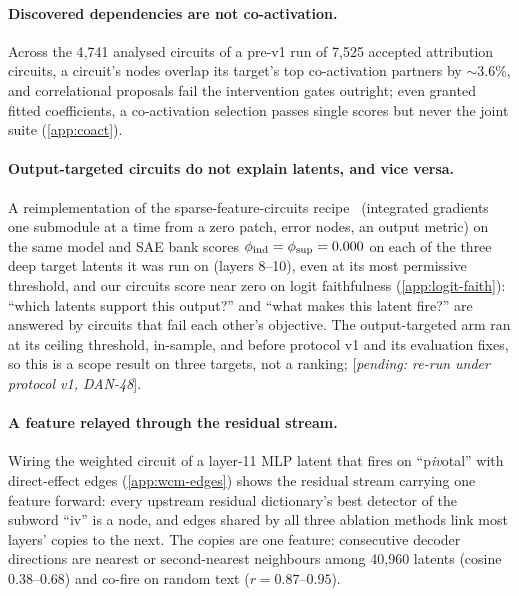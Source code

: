 \documentclass[10pt]{article}
\newcommand{\pending}[1]{\textcolor{red!70!black}{[\textit{pending: #1}]}}
\begin{document}
\paragraph{Discovered dependencies are not co-activation.}
Across the 4{,}741 analysed circuits of a pre-v1 run of 7{,}525 accepted attribution circuits, a circuit's nodes overlap its target's top co-activation partners by ${\sim}3.6\%$, and correlational proposals fail the intervention gates outright; even granted fitted coefficients, a co-activation selection passes single scores but never the joint suite (\cref{app:coact}).

\paragraph{Output-targeted circuits do not explain latents, and vice versa.}
\label{sec:sfc-boundary}
A reimplementation of the sparse-feature-circuits recipe~\citep{marks2025sparse} (integrated gradients one submodule at a time from a zero patch, error nodes, an output metric) on the same model and SAE bank scores $\phi_{\mathrm{ind}} = \phi_{\mathrm{sup}} = 0.000$ on each of the three deep target latents it was run on (layers 8--10), even at its most permissive threshold, and our circuits score near zero on logit faithfulness (\cref{app:logit-faith}): ``which latents support this output?'' and ``what makes this latent fire?'' are answered by circuits that fail each other's objective.
The output-targeted arm ran at its ceiling threshold, in-sample, and before protocol v1 and its evaluation fixes, so this is a scope result on three targets, not a ranking; \pending{re-run under protocol v1, DAN-48}.

\paragraph{A feature relayed through the residual stream.}
\label{sec:relay}
Wiring the weighted circuit of a layer-11 MLP latent that fires on ``p\emph{iv}otal'' with direct-effect edges (\cref{app:wcm-edges}) shows the residual stream carrying one feature forward: every upstream residual dictionary's best detector of the subword ``iv'' is a node, and edges shared by all three ablation methods link most layers' copies to the next.
The copies are one feature: consecutive decoder directions are nearest or second-nearest neighbours among 40{,}960 latents (cosine $0.38$--$0.68$) and co-fire on random text ($r = 0.87$--$0.95$).
\end{document}
